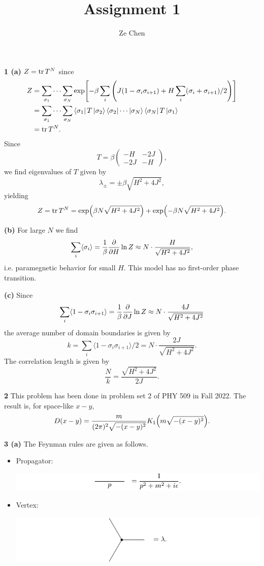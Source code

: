 \documentclass{article}
\title{Assignment 1}
\author{Ze Chen}
\makeatletter
\newcommand*{\shifttext}[1]{%
  \settowidth{\@tempdima}{#1}%
  \hspace{-\@tempdima}#1%
}
\newcommand{\plabel}[1]{%
\shifttext{\textbf{#1}\quad}%
}
\newcommand{\prule}{%
\begin{center}%
\hdashrule[0.5ex]{.99\linewidth}{1pt}{1pt 2.5pt}%
\end{center}%
}
\makeatother
\begin{document}
\maketitle

\plabel{1 (a)}%
$Z = \tr T^N$ since
\begin{align*}
    Z &= \sum_{\sigma_1} \cdots \sum_{\sigma_N} \exp[-\beta \sum_i\qty(J(1 - \sigma_{i}\sigma_{i+1}) + H \sum_i (\sigma_i+\sigma_{i+1})/2)] \\
    &= \sum_{\sigma_1} \cdots \sum_{\sigma_N} \bra{\sigma_1} T \ket{\sigma_2} \bra{\sigma_2} \cdots \ket{\sigma_{N}} \bra{\sigma_{N}} T \ket{\sigma_1} \\
    &= \tr T^N.
\end{align*}
Since
\[ T = \beta \begin{pmatrix}
    -H & -2J \\
    -2J & -H
\end{pmatrix}, \]
we find eigenvalues of $T$ given by
\[ \lambda_\pm = \pm \beta\sqrt{H^2+4J^2}, \]
yielding
\[ Z = \tr T^N = \exp(\beta N \sqrt{H^2+4J^2}) + \exp(-\beta N\sqrt{H^2+4J^2}). \]

\plabel{(b)}%
For large $N$ we find
\[ \sum_i \langle \sigma_i \rangle = \frac{1}{\beta} \pdv{H} \ln Z \approx N \cdot \frac{H}{\sqrt{H^2 + 4J^2}}, \]
i.e. paramegnetic behavior for small $H$.
This model has no first-order phase transition.

\plabel{(c)}%
Since
\[ \sum_i \langle 1 - \sigma_i\sigma_{i+1} \rangle = \frac{1}{\beta} \pdv{J} \ln Z \approx N \cdot \frac{4J}{\sqrt{H^2 + 4J^2}} \]
the average number of domain boundaries is given by
\[ k = \sum_i \langle 1 - \sigma_i\sigma_{i+1} \rangle / 2 = N \cdot \frac{2J}{\sqrt{H^2 + 4J^2}}. \]
The correlation length is given by
\[ \frac{N}{k} = \frac{\sqrt{H^2 + 4J^2}}{2J}. \]

\prule

\plabel{2}%
This problem has been done in problem set 2 of PHY 509 in Fall 2022.
The result is, for space-like $x-y$,
\[ D(x-y) = \frac{m}{(2\pi)^2 \sqrt{-(x-y)^2}} K_1\qty(m\sqrt{-(x-y)^2}). \]

\prule

\plabel{3 (a)}%
The Feynman rules are given as follows.
\begin{itemize}
    \item Propagator:
    \begin{center}
        \includegraphics{img/propagator/propagator.pdf}
    \end{center}
    \item Vertex:
    \begin{center}
        \includegraphics{img/vertex/vertex.pdf}
    \end{center}
\end{itemize}
\end{document}
